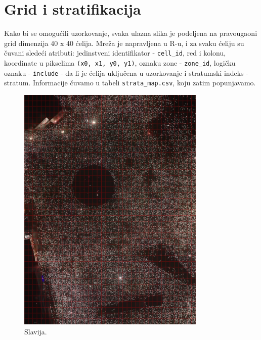 \documentclass[a4paper,12pt]{article}
\begin{document}
\newpage
\section{Grid i stratifikacija}

Kako bi se omogućili uzorkovanje, svaka ulazna slika je podeljena na pravougaoni grid dimenzija 40 x 40 ćelija. 
Mreža je napravljena u R-u, i za svaku ćeliju su čuvani sledeći atributi: 
jedinstveni identifikator - \texttt{cell\_id}, red i kolonu, koordinate u pikselima \texttt{(x0, x1, y0, y1)}, oznaku zone - \texttt{zone\_id}, 
logičku oznaku - \texttt{include} - da li je ćelija uključena u uzorkovanje i stratumski indeks - stratum.
Informacije čuvamo u tabeli \texttt{strata\_map.csv}, koju zatim popunjavamo.

\begin{figure}[H] 
	\centering 
	\includegraphics[width=0.8\textwidth]{../outputs/grid_output/slavija-centar_grid.png} 
	\caption{Slavija.} 
	\label{fig:slavija} 
\end{figure}
\end{document}
